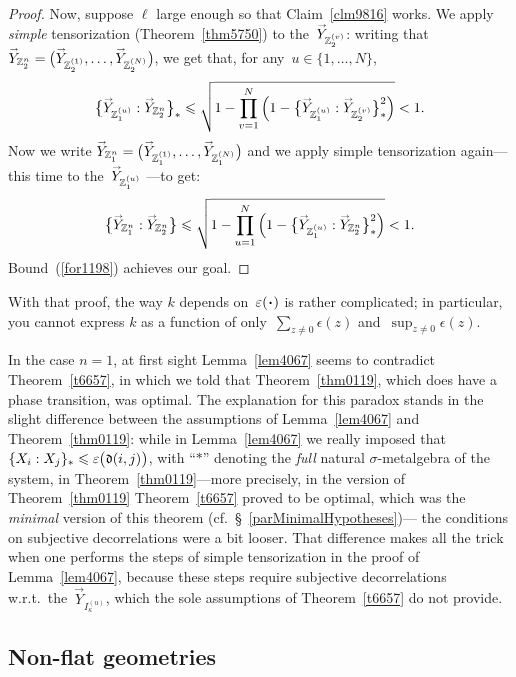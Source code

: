 \begin{proof}
Now, suppose $\ell$ large enough so that Cl\-aim~\ref{clm9816} works.
We apply \emph{simple} tensorization (Theorem~\ref{thm5750}) to the~$\vec{Y}_{\ZZ_2^{(v)}}$:
writing that $\vec{Y}_{\ZZ^n_2} = \big( \vec{Y}_{\ZZ_2^{(1)}}, \ldots, \vec{Y}_{\ZZ_2^{(N)}} \big)$,
we get that, for any~$u\in\{1,\ldots,N\}$,
\[\label{for8741} \big\{ \vec{Y}_{\ZZ_1^{(u)}} : \vec{Y}_{\ZZ^n_2} \big\}_*
\leq \sqrt{ 1 - \prod_{v=1}^{N}
\left( 1 - \big\{ \vec{Y}_{\ZZ_1^{(u)}}:\vec{Y}_{\ZZ_2^{(v)}} \big\}_*^2 \right) } < 1 .\]
%
Now we write $\vec{Y}_{\ZZ^n_1} = \big( \vec{Y}_{\ZZ_1^{(1)}}, \ldots, \vec{Y}_{\ZZ_1^{(N)}} \big)$
and we apply simple tensorization again\ab —this time to the~$\vec{Y}_{\ZZ_1^{(u)}}$ —to get:
\[\label{for1198}
\big\{ \vec{Y}_{\ZZ^n_1} : \vec{Y}_{\ZZ^n_2} \big\}
\leq \sqrt{ 1 - \prod_{u=1}^{N}
\left( 1 - \big\{ \vec{Y}_{\ZZ_1^{(u)}}:\vec{Y}_{\ZZ^n_2} \big\}_*^2 \right) } < 1 .\]
Bound~(\ref{for1198}) achieves our goal.
\end{proof}

\begin{Rmk}
With that proof, the way $k$ depends on~$\epsilon(\Bcdot)$ is rather complicated;
in particular, you cannot express $k$
as a function of only~$\sum_{z\neq0} \epsilon(z)$ and~$\sup_{z\neq0} \epsilon(z)$.
\end{Rmk}

\begin{Rmk}
In the case $n=1$, at first sight Lemma~\ref{lem4067} seems to contradict Theorem~\ref{t6657},
in which we told that Theorem~\ref{thm0119}, which does have a phase transition, was optimal.
The explanation for this paradox stands in the slight difference between the assumptions
of Lemma~\ref{lem4067} and Theorem~\ref{thm0119}:
while in Lemma~\ref{lem4067} we really imposed that $\{X_i:X_j\}_* \leq \epsilon\big(\mfrak{d}(i,j)\big)$,
with ``$*$'' denoting the \emph{full} natural $\sigma$-metalgebra of the system,
in Theorem~\ref{thm0119}—more precisely, in the version of Theorem~\ref{thm0119}
Theorem~\ref{t6657} proved to be optimal, which was the \emph{minimal} version of this theorem
(cf.\ \S~\ref{parMinimalHypotheses})—%
the conditions on subjective decorrelations were a bit looser.
That difference makes all the trick when one performs the steps of simple tensorization in the proof of Lemma~\ref{lem4067},
because these steps require subjective decorrelations w.r.t.\ the~$\vec{Y}_{I_\kappa^{(u)}}$,
which the sole assumptions of Theorem~\ref{t6657} do not provide.
\end{Rmk}


\subsection{Non-flat geometries}\label{parNonFlat}

